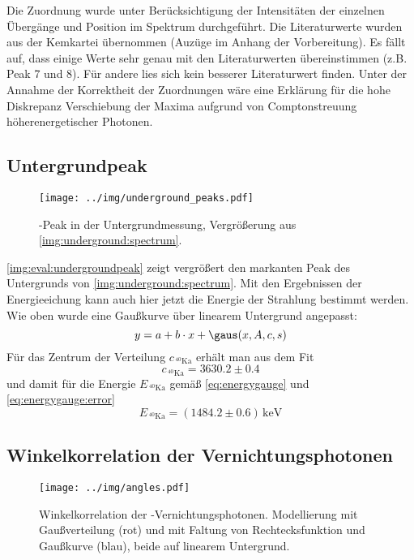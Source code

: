 Die Zuordnung wurde unter Berücksichtigung der Intensitäten der einzelnen Übergänge und Position im Spektrum durchgeführt. Die Literaturwerte 
wurden aus der Kemkartei übernommen (Auzüge im Anhang der Vorbereitung). Es fällt auf, dass einige Werte sehr genau mit den Literaturwerten 
übereinstimmen (z.B. Peak 7 und 8). Für andere lies sich kein besserer Literaturwert finden. Unter der Annahme der Korrektheit der Zuordnungen wäre 
eine Erklärung für die hohe Diskrepanz Verschiebung der Maxima aufgrund von Comptonstreuung höherenergetischer Photonen.

\subsection{Untergrundpeak}
\label{sub:eval:undergroundpeak}

\begin{figure}[H]
\begin{center}
  \texttt{[image: ../img/underground\_peaks.pdf]}
  \caption{-Peak in der Untergrundmessung, Vergrößerung aus \autoref{img:underground:spectrum}.}
  \label{img:eval:undergroundpeak}
\end{center}
\end{figure}

\autoref{img:eval:undergroundpeak} zeigt vergrößert
den markanten Peak des Untergrunds von \autoref{img:underground:spectrum}.
Mit den Ergebnissen der Energieeichung kann auch hier jetzt die Energie der Strahlung bestimmt werden.
Wie oben wurde eine Gaußkurve über linearem Untergrund angepasst:
\begin{equation}
  y = a + b \cdot x + \gaus(x, A, c, s)
\end{equation}
Für das Zentrum der Verteilung $c_{\,{}^{40}\text{Ka}}$ erhält man aus dem Fit
\begin{equation}
  c_{\,{}^{40}\text{Ka}} = 3630.2 \pm 0.4	
\end{equation}
und damit für die Energie $E_{\,{}^{40}\text{Ka}}$ gemäß \autoref{eq:energygauge} und \autoref{eq:energygauge:error}
\begin{equation}
  E_{\,{}^{40}\text{Ka}} = (1484.2 \pm 0.6)\,\text{keV}
\end{equation}


\subsection{Winkelkorrelation der  Vernichtungsphotonen}
\begin{figure}[H]
\begin{center}
  \texttt{[image: ../img/angles.pdf]}
  \caption{Winkelkorrelation der \na-Vernichtungsphotonen.
  Modellierung mit Gaußverteilung (rot) und
  mit Faltung von Rechtecksfunktion und Gaußkurve (blau), beide auf linearem Untergrund.}
  \label{img:angles}
\end{center}
\end{figure}

